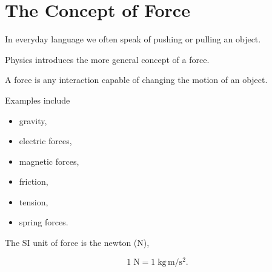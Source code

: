 \section{The Concept of Force}

In everyday language we often speak of pushing or pulling an object.

Physics introduces the more general concept of a force.

A force is any interaction capable of changing the motion of an object.

Examples include

\begin{itemize}
	\item gravity,
	\item electric forces,
	\item magnetic forces,
	\item friction,
	\item tension,
	\item spring forces.
\end{itemize}

The SI unit of force is the newton (N),

\[
1\;\mathrm N
=
1\;\mathrm{kg\,m/s^2}.
\]

